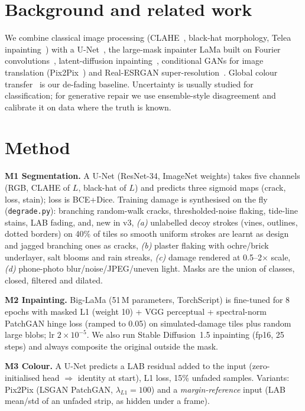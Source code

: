 \documentclass[11pt,a4paper,twocolumn]{article}
\begin{document}
\section{Background and related work}
We combine classical image processing (CLAHE~\cite{zuiderveld1994clahe}, black-hat morphology, Telea inpainting~\cite{telea2004}) with
a U-Net~\cite{ronneberger2015unet}, the large-mask inpainter LaMa built on Fourier convolutions~\cite{suvorov2022lama}, latent-diffusion
inpainting~\cite{rombach2022ldm}, conditional GANs for image translation (Pix2Pix~\cite{isola2017pix2pix}) and Real-ESRGAN super-resolution~\cite{wang2021realesrgan}. Global colour transfer~\cite{reinhard2001} is our de-fading baseline.
Uncertainty is usually studied for classification; for generative repair we use ensemble-style disagreement and calibrate it on data where the truth is known.

\section{Method}
\textbf{M1 Segmentation.} A U-Net (ResNet-34, ImageNet weights) takes five channels (RGB, CLAHE of $L$, black-hat of $L$) and predicts three sigmoid maps
(crack, loss, stain); loss is BCE+Dice. Training damage is synthesised on the fly (\texttt{degrade.py}): branching random-walk cracks, thresholded-noise
flaking, tide-line stains, LAB fading, and, new in v3, \emph{(a)} unlabelled decoy strokes (vines, outlines, dotted borders) on 40\% of tiles so smooth uniform
strokes are learnt as design and jagged branching ones as cracks, \emph{(b)} plaster flaking with ochre/brick underlayer, salt blooms and rain streaks,
\emph{(c)} damage rendered at 0.5--2$\times$ scale, \emph{(d)} phone-photo blur/noise/JPEG/uneven light. Masks are the union of classes, closed, filtered and dilated.

\textbf{M2 Inpainting.} Big-LaMa (51\,M parameters, TorchScript) is fine-tuned for 8 epochs with masked L1 (weight 10) + VGG perceptual + spectral-norm PatchGAN hinge loss
(ramped to 0.05) on simulated-damage tiles plus random large blobs; lr $2\!\times\!10^{-5}$. We also run Stable Diffusion~1.5 inpainting (fp16, 25 steps) and always composite the original outside the mask.

\textbf{M3 Colour.} A U-Net predicts a LAB residual added to the input (zero-initialised head $\Rightarrow$ identity at start), L1 loss, 15\% unfaded samples.
Variants: Pix2Pix (LSGAN PatchGAN, $\lambda_{L1}=100$) and a \emph{margin-reference} input (LAB mean/std of an unfaded strip, as hidden under a frame).
\end{document}
